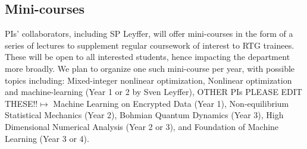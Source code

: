\documentclass[11pt]{NSFamsart}
\newcommand{\FredNote}[1]{{\color{blue} Fred: #1}}
\begin{document}
\subsection*{Mini-courses} \label{mini courses}
PIs' collaborators, including SP Leyffer, will offer mini-courses in the form of a series of lectures to supplement regular coursework of interest to RTG trainees. These will be open to all interested students, hence impacting the department more broadly. 
We plan to organize one such mini-course per year, with possible topics including: 
Mixed-integer nonlinear optimization, Nonlinear optimization and machine-learning (Year 1 or 2 by Sven Leyffer), 
{\color{red}OTHER PIs PLEASE EDIT THESE!!$\mapsto$} Machine Learning on Encrypted Data (Year 1),  Non-equilibrium Statistical Mechanics (Year 2),   Bohmian Quantum Dynamics (Year 3), High Dimensional Numerical Analysis (Year 2 or 3), and Foundation of Machine Learning (Year 3 or 4). 

\end{document}
